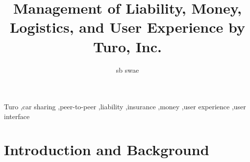 \documentclass[review,12pt]{elsarticle}
\begin{document}
\begin{frontmatter}


\title{Management of Liability, Money, Logistics, and User Experience by Turo, Inc.}




\author{sb swae}

\address{\href{mailto:sb.swae@gmail.com}{sb.swae@gmail.com}; \url{https://swaevior.io}}

\begin{abstract}
\blindtext
\end{abstract}

\begin{keyword}
Turo \sep car sharing \sep peer-to-peer \sep liability \sep insurance \sep money \sep user experience \sep user interface


\end{keyword}

\end{frontmatter}

\linenumbers

\section{Introduction and Background}
\label{S:1}
\end{document}
